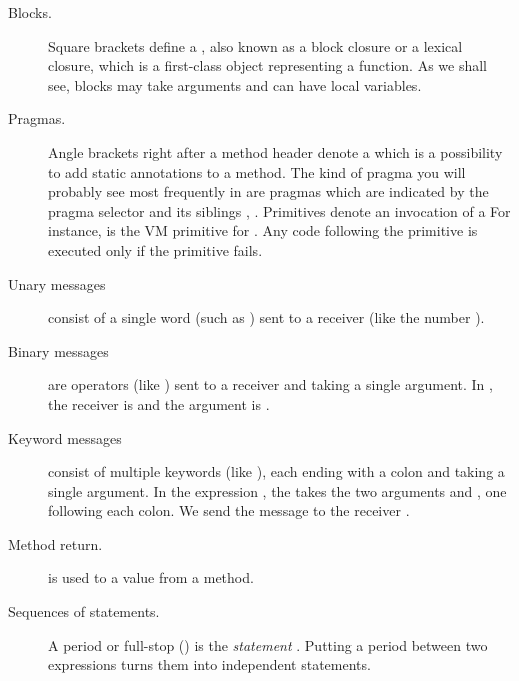 \documentclass[a4paper,10pt,twoside]{book}
\begin{document}
\begin{description}
\item[Blocks.]
	Square brackets \ct{[ ]} define a , also known as a block closure or a lexical closure, which is a first-class object representing a function.
	As we shall see, blocks may take arguments and can have local variables.

\item[Pragmas.]
	Angle brackets \ct{< >} right after a method header denote a  which is a possibility to add static annotations to a method.
	The kind of pragma you will probably see most frequently in \sq are \emph{} pragmas which are indicated by the pragma selector  and its siblings ,  \etc*.
	Primitives denote an invocation of a  
	For instance,  is the VM primitive for .
	Any code following the primitive is executed only if the primitive fails.

\item[Unary messages] consist of a single word (such as ) sent to a receiver (like the number ).

\item[Binary messages] are operators (like \ct{+}) sent to a receiver and taking a single argument.
	In , the receiver is  and the argument is .

\item[Keyword messages] consist of multiple keywords (like ), each ending with a colon and taking a single argument.
	In the expression , the   takes the two arguments  and , one following each colon.
	We send the message to the receiver .

\item[Method return.]
	\ct{^} is used to  a value from a method.

\item[Sequences of statements.]
	A period or full-stop () is the \emph{statement} .
	Putting a period between two expressions turns them into independent statements.


\end{description}
\end{document}
